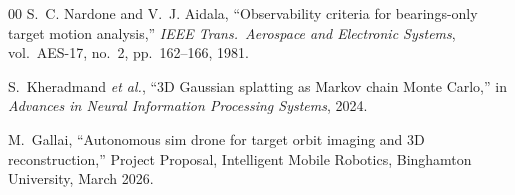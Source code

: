 \documentclass[conference]{IEEEtran}
\begin{document}
\begin{thebibliography}{00}
S.~C. Nardone and V.~J. Aidala, ``Observability criteria for
bearings-only target motion analysis,'' \emph{IEEE Trans.\
Aerospace and Electronic Systems}, vol.~AES-17, no.~2,
pp.~162--166, 1981.

S.~Kheradmand \emph{et al.}, ``3D Gaussian splatting as Markov
chain Monte Carlo,'' in \emph{Advances in Neural Information
Processing Systems}, 2024.

M.~Gallai, ``Autonomous sim drone for target orbit imaging and 3D
reconstruction,'' Project Proposal, Intelligent Mobile Robotics,
Binghamton University, March 2026.

\end{thebibliography}
\end{document}
